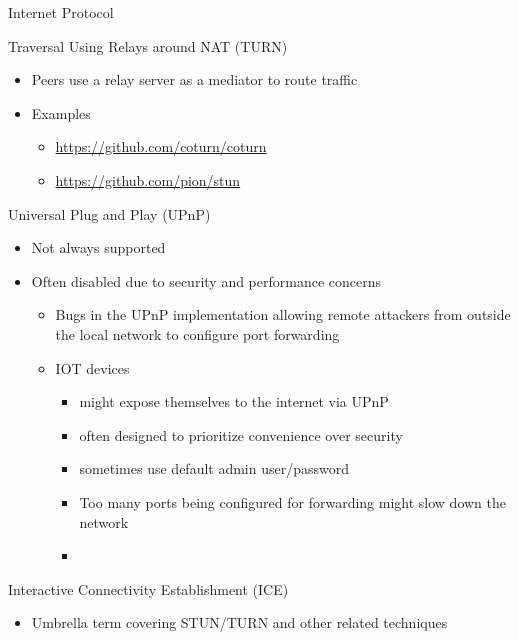 \begin{block}{Internet Protocol}
\begin{block}{Traversal Using Relays around NAT (TURN)}
\label{notes__02021-internet-protocol.md__traversal-using-relays-around-nat-turn}
\begin{itemize}
\item
  Peers use a relay server as a mediator to route traffic
\item
  Examples

  \begin{itemize}
  \item
    \url{https://github.com/coturn/coturn}
  \item
    \url{https://github.com/pion/stun}
  \end{itemize}
\end{itemize}
\end{block}

\begin{block}{Universal Plug and Play (UPnP)}
\label{notes__02021-internet-protocol.md__universal-plug-and-play-upnp}
\begin{itemize}
\tightlist
\item
  Not always supported
\item
  Often disabled due to security and performance concerns

  \begin{itemize}
  \tightlist
  \item
    Bugs in the UPnP implementation allowing remote attackers from outside the local network to configure port forwarding
  \item
    IOT devices

    \begin{itemize}
    \tightlist
    \item
      might expose themselves to the internet via UPnP
    \item
      often designed to prioritize convenience over security
    \item
      sometimes use default admin user/password
    \item
      Too many ports being configured for forwarding might slow down the network
    \item
    \end{itemize}
  \end{itemize}
\end{itemize}
\end{block}

\begin{block}{Interactive Connectivity Establishment (ICE)}
\label{notes__02021-internet-protocol.md__interactive-connectivity-establishment-ice}
\begin{itemize}
\tightlist
\item
  Umbrella term covering STUN/TURN and other related techniques
\end{itemize}
\end{block}


\end{block}
